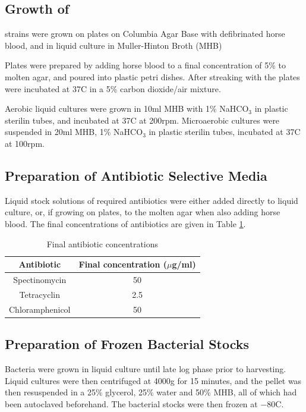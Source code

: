 \subsection{Growth of \Nsm}
\Nm\space strains were grown on plates on Columbia Agar Base with defibrinated horse blood, and in liquid culture in Muller-Hinton Broth (MHB)

Plates were prepared by adding horse blood to a final concentration of 5\% to molten agar, and poured into plastic petri dishes. After streaking with \Nm\space the plates were incubated at 37\textdegree C in a 5\% carbon dioxide/air mixture.

Aerobic liquid cultures were grown in 10ml MHB with 1\% NaHCO$_\textrm{3}$ in plastic sterilin tubes, and incubated at 37\textdegree C at 200rpm. Microaerobic cultures were suspended in 20ml MHB, 1\% NaHCO$_\textrm{3}$ in plastic sterilin tubes, incubated at 37\textdegree C at 100rpm.

\subsection{Preparation of Antibiotic Selective Media}
Liquid stock solutions of required antibiotics were either added directly to liquid culture, or, if growing on plates, to the molten agar when also adding horse blood. The final concentrations of antibiotics are given in Table \ref{tab:antibiotic-concs}.

\begin{table}[here]
\begin{center}
\begin{tabular}{c|c}
\textbf{Antibiotic} & \textbf{Final concentration ($\mu$g/ml)} \\
\hline
Spectinomycin & 50 \\
Tetracyclin & 2.5 \\
Chloramphenicol & 50 \\
\hline
\end{tabular} 
\end{center}
\small{\caption{Final antibiotic concentrations}
\label{tab:antibiotic-concs}}
\end{table}

\subsection{Preparation of Frozen Bacterial Stocks}
Bacteria were grown in liquid culture until late log phase prior to harvesting. Liquid cultures were then centrifuged at 4000g for 15 minutes, and the pellet was then resuspended in a 25\% glycerol, 25\% water and 50\% MHB, all of which had been autoclaved beforehand. The bacterial stocks were then frozen at $-80$\textdegree C.

